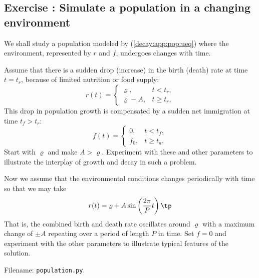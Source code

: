 \documentclass[graybox,sectrefs,envcountresetchap,open=right,final]{svmonodo}
\newenvironment{doconceexercise}{}{}
\newcounter{doconceexercisecounter}
\begin{document}
\begin{doconceexercise}

\subsection*{Exercise \thedoconceexercisecounter: Simulate a population in a changing environment}

\label{decay:app:exer:pop:at}

We shall study a population modeled by (\ref{decay:app:pop:ueq}) where
the environment, represented by $r$ and $f$, undergoes changes with time.


Assume that there is a sudden drop (increase) in the birth (death)
rate at time $t=t_r$,
because of limited nutrition or food supply:
\[ r(t) =\left\lbrace\begin{array}{ll}
\varrho, & t < t_r,\\ 
\varrho - A, & t\geq t_r,\end{array}\right.
\]
This drop in population growth is compensated by a sudden net immigration
at time $t_f > t_r$:
\[ f(t) =\left\lbrace\begin{array}{ll}
0, & t < t_f,\\ 
f_0, & t\geq t_a,\end{array}\right.
\]
Start with $\varrho$ and make $A > \varrho$. Experiment with
these and other parameters to
illustrate the interplay of growth and decay in such a problem.

Now we assume that the environmental conditions changes periodically with
time so that we may take
\[ r(t) = {\varrho} + A\sin\left(\frac{2\pi}{P}t\right)
\tp
\]
That is, the combined birth and death rate oscillates around $\varrho$ with
a maximum change of $\pm A$ repeating over a period of length $P$ in time.
Set $f=0$ and experiment with the other parameters to illustrate typical
features of the solution.

\noindent Filename: \texttt{population.py}.

\end{doconceexercise}
\end{document}
